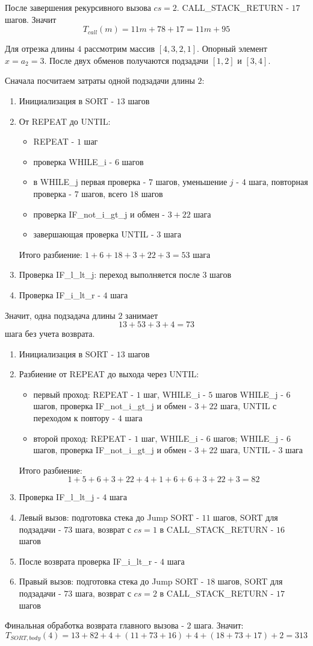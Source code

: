 \documentclass[12pt]{article}
\begin{document}
После завершения рекурсивного вызова
$cs=2$. CALL\_STACK\_RETURN - $17$ шагов. 
Значит
\[
    T_{call}(m)=11m+78+17=11m+95
\]

Для отрезка длины $4$ рассмотрим массив $[4,3,2,1]$. Опорный элемент
$x=a_2=3$. После двух обменов получаются подзадачи $[1,2]$ и $[3,4]$.

Сначала посчитаем затраты одной подзадачи длины $2$:
\begin{enumerate}
    \item Инициализация в SORT - $13$ шагов
    \item От REPEAT до UNTIL:
    \begin{itemize}
        \item REPEAT - $1$ шаг
        \item проверка WHILE\_i - $6$ шагов
        \item в WHILE\_j первая проверка - $7$ шагов, уменьшение $j$ - $4$ шага,
        повторная проверка - $7$ шагов, всего $18$ шагов
        \item проверка IF\_not\_i\_gt\_j и обмен - $3+22$ шага
        \item завершающая проверка UNTIL - $3$ шага
    \end{itemize}
    Итого разбиение: $1+6+18+3+22+3=53$ шага
    \item Проверка IF\_l\_lt\_j: переход выполняется после $3$ шагов
    \item Проверка IF\_i\_lt\_r - $4$ шага
\end{enumerate}
Значит, одна подзадача длины $2$ занимает
\[
    13+53+3+4=73
\]
шага без учета возврата.

\begin{enumerate}
    \item Инициализация в SORT - $13$ шагов
    \item Разбиение от REPEAT до выхода через UNTIL:
    \begin{itemize}
        \item первый проход: REPEAT - $1$ шаг, WHILE\_i - $5$ шагов
        WHILE\_j - $6$ шагов, проверка IF\_not\_i\_gt\_j и обмен - $3+22$ шага,
        UNTIL с переходом к повтору - $4$ шага
        \item второй проход: REPEAT - $1$ шаг, WHILE\_i - $6$ шагов;
        WHILE\_j - $6$ шагов, проверка IF\_not\_i\_gt\_j и обмен - $3+22$ шага,
        UNTIL - $3$ шага
    \end{itemize}
    Итого разбиение:
    \[
        1+5+6+3+22+4+1+6+6+3+22+3=82
    \]
    \item Проверка IF\_l\_lt\_j - $4$ шага
    \item Левый вызов: подготовка стека до Jump SORT - $11$ шагов,
    SORT для подзадачи - $73$ шага,
    возврат с $cs=1$ в CALL\_STACK\_RETURN - $16$ шагов
    \item После возврата проверка IF\_i\_lt\_r - $4$ шага
    \item Правый вызов: подготовка стека до Jump SORT - $18$ шагов,
    SORT для подзадачи - $73$ шага,
    возврат с $cs=2$ в CALL\_STACK\_RETURN - $17$ шагов
\end{enumerate}
Финальная обработка возврата главного вызова - $2$ шага.
Значит:
\[
    T_{SORT, body}(4)=13+82+4+(11+73+16)+4+(18+73+17)+2=313
\]
\end{document}
